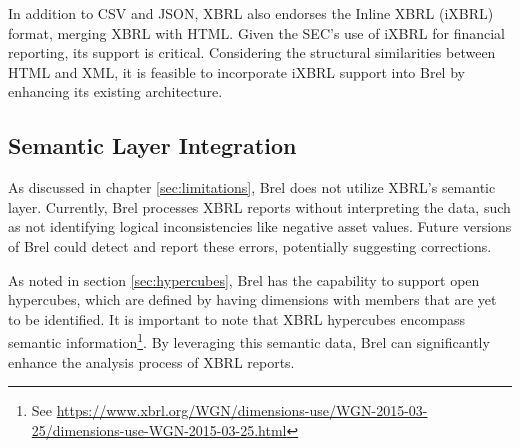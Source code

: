 In addition to CSV and JSON, XBRL also endorses the Inline XBRL (iXBRL) format, merging XBRL with HTML.
Given the SEC's use of iXBRL for financial reporting, its support is critical.
Considering the structural similarities between HTML and XML, it is feasible to incorporate iXBRL support into Brel by enhancing its existing architecture.



\subsection{Semantic Layer Integration}

As discussed in chapter \ref{sec:limitations}, Brel does not utilize XBRL's semantic layer.
Currently, Brel processes XBRL reports without interpreting the data, such as not identifying logical inconsistencies like negative asset values.
Future versions of Brel could detect and report these errors, potentially suggesting corrections.

As noted in section \ref{sec:hypercubes}, Brel has the capability to support open hypercubes,
which are defined by having dimensions with members that are yet to be identified.
It is important to note that XBRL hypercubes encompass semantic information\footnote{See \url{https://www.xbrl.org/WGN/dimensions-use/WGN-2015-03-25/dimensions-use-WGN-2015-03-25.html}}.
By leveraging this semantic data, Brel can significantly enhance the analysis process of XBRL reports.


